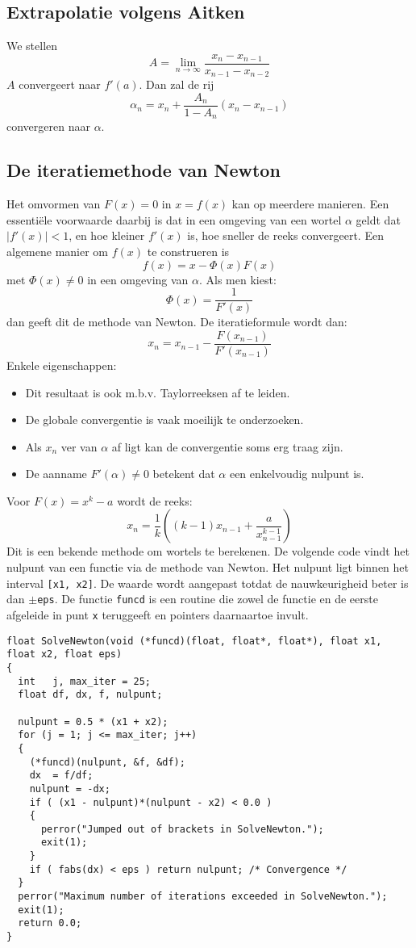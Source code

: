 \subsection{Extrapolatie volgens Aitken}
We stellen
\[
A=\lim_{n\rightarrow\infty}\frac{x_n-x_{n-1}}{x_{n-1}-x_{n-2}}
\]
$A$ convergeert naar $f'(a)$. Dan zal de rij
\[
\alpha_n=x_n+\frac{A_n}{1-A_n}(x_n-x_{n-1})
\]
convergeren naar $\alpha$.

\subsection{De iteratiemethode van Newton}
Het omvormen van $F(x)=0$ in $x=f(x)$ kan op meerdere manieren. Een
essenti\"ele voorwaarde daarbij is dat in een omgeving van een wortel
$\alpha$ geldt dat $|f'(x)|<1$, en hoe kleiner $f'(x)$ is, hoe sneller
de reeks convergeert. Een algemene manier om $f(x)$ te construeren is
\[
f(x)=x-\Phi(x)F(x)
\]
met $\Phi(x)\neq0$ in een omgeving van $\alpha$. Als men kiest:
\[
\Phi(x)=\frac{1}{F'(x)}
\]
dan geeft dit de methode van Newton. De iteratieformule wordt dan:
\[
x_n=x_{n-1}-\frac{F(x_{n-1})}{F'(x_{n-1})}
\]
Enkele eigenschappen:
\begin{itemize}
\item Dit resultaat is ook m.b.v. Taylorreeksen af te leiden.
\item De globale convergentie is vaak moeilijk te onderzoeken.
\item Als $x_n$ ver van $\alpha$ af ligt kan de convergentie soms erg traag zijn.
\item De aanname $F'(\alpha)\neq0$ betekent dat $\alpha$ een enkelvoudig
      nulpunt is.
\end{itemize}
Voor $F(x)=x^k-a$ wordt de reeks:
\[
x_n=\frac{1}{k}\left((k-1)x_{n-1}+\frac{a}{x_{n-1}^{k-1}}\right)
\]
Dit is een bekende methode om wortels te berekenen.
\npar
De volgende code vindt het nulpunt van een functie via de methode van Newton.
Het nulpunt ligt binnen het interval {\tt [x1, x2]}. De waarde wordt
aangepast totdat de nauwkeurigheid beter is dan {\tt$\pm$eps}. De functie
{\tt funcd} is een routine die zowel de functie en de eerste afgeleide in
punt {\tt x} teruggeeft en pointers daarnaartoe invult.
\begin{verbatim}
float SolveNewton(void (*funcd)(float, float*, float*), float x1, float x2, float eps)
{
  int   j, max_iter = 25;
  float df, dx, f, nulpunt;

  nulpunt = 0.5 * (x1 + x2);
  for (j = 1; j <= max_iter; j++)
  {
    (*funcd)(nulpunt, &f, &df);
    dx  = f/df;
    nulpunt = -dx;
    if ( (x1 - nulpunt)*(nulpunt - x2) < 0.0 )
    {
      perror("Jumped out of brackets in SolveNewton.");
      exit(1);
    }
    if ( fabs(dx) < eps ) return nulpunt; /* Convergence */
  }
  perror("Maximum number of iterations exceeded in SolveNewton.");
  exit(1);
  return 0.0;
}
\end{verbatim}

